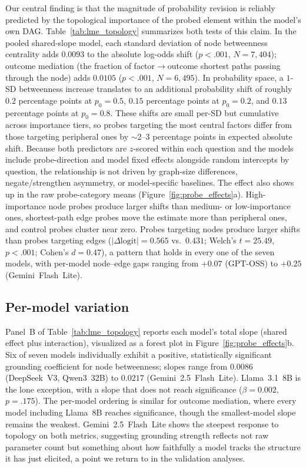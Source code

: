 \documentclass[11pt]{article}
\begin{document}
Our central finding is that the magnitude of probability revision is reliably predicted by the topological importance of the probed element within the model's own DAG. Table~\ref{tab:lme_topology} summarizes both tests of this claim. In the pooled shared-slope model, each standard deviation of node betweenness centrality adds $0.0093$ to the absolute log-odds shift ($p < .001$, $N = 7{,}404$); outcome mediation (the fraction of factor$\rightarrow$outcome shortest paths passing through the node) adds $0.0105$ ($p < .001$, $N = 6{,}495$). In probability space, a $1$-SD betweenness increase translates to an additional probability shift of roughly $0.2$ percentage points at $p_0 = 0.5$, $0.15$ percentage points at $p_0 = 0.2$, and $0.13$ percentage points at $p_0 = 0.8$. These shifts are small per-SD but cumulative across importance tiers, so probes targeting the most central factors differ from those targeting peripheral ones by $\sim$2--3 percentage points in expected absolute shift. Because both predictors are $z$-scored within each question and the models include probe-direction and model fixed effects alongside random intercepts by question, the relationship is not driven by graph-size differences, negate/strengthen asymmetry, or model-specific baselines. The effect also shows up in the raw probe-category means (Figure~\ref{fig:probe_effects}a). High-importance node probes produce larger shifts than medium- or low-importance ones, shortest-path edge probes move the estimate more than peripheral ones, and control probes cluster near zero. Probes targeting nodes produce larger shifts than probes targeting edges ($|\Delta\text{logit}| = 0.565$ vs.\ $0.431$; Welch's $t = 25.49$, $p < .001$; Cohen's $d = 0.47$), a pattern that holds in every one of the seven models, with per-model node--edge gaps ranging from $+0.07$ (GPT-OSS) to $+0.25$ (Gemini~Flash~Lite).

\subsection{Per-model variation}
\label{sec:results-per-model}

Panel~B of Table~\ref{tab:lme_topology} reports each model's total slope (shared effect plus interaction), visualized as a forest plot in Figure~\ref{fig:probe_effects}b. Six of seven models individually exhibit a positive, statistically significant grounding coefficient for node betweenness; slopes range from $0.0086$ (DeepSeek~V3, Qwen3~32B) to $0.0217$ (Gemini~2.5~Flash~Lite). Llama~3.1~8B is the lone exception, with a slope that does not reach significance ($\beta = 0.002$, $p = .175$). The per-model ordering is similar for outcome mediation, where every model including Llama~8B reaches significance, though the smallest-model slope remains the weakest. Gemini~2.5~Flash~Lite shows the steepest response to topology on both metrics, suggesting grounding strength reflects not raw parameter count but something about how faithfully a model tracks the structure it has just elicited, a point we return to in the validation analyses.
\end{document}
